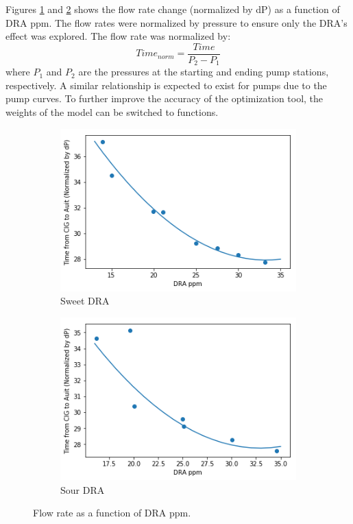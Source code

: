 Figures \ref{fig:08Sweet_dra_curve} and \ref{fig:08Sour_dra_curve} shows the flow rate change (normalized by dP) as a function of DRA ppm. The flow rates were normalized by pressure to ensure only the DRA's effect was explored.  The flow rate was normalized by:
\begin{equation}
    Time_{norm} = \frac{Time}{P_2 - P_1}
\end{equation}
where $P_1$ and $P_2$ are the pressures at the starting and ending pump stations, respectively. A similar relationship is expected to exist for pumps due to the pump curves.  To further improve the accuracy of the optimization tool, the weights of the model can be switched to functions.  
\begin{figure}
    \centering
    \begin{subfigure}[b]{0.48\textwidth}
        \includegraphics[width=\textwidth]{images/08Sweet_dra_curve.png}
        \caption{Sweet DRA}
        \label{fig:08Sweet_dra_curve}
    \end{subfigure}
    \begin{subfigure}[b]{0.48\textwidth}
        \includegraphics[width=\textwidth]{images/08Sour_dra_curve.png}
        \caption{Sour DRA}
        \label{fig:08Sour_dra_curve}
    \end{subfigure}
        \caption{Flow rate as a function of DRA ppm.}
        \label{fig:my_label}
\end{figure}

